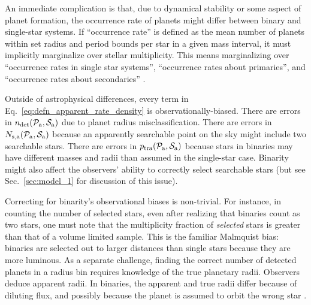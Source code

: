 \documentclass[12pt,modern]{aastex61}
\newcommand{\pp}{\mathcal{P}}
\newcommand{\ps}{\mathcal{S}}
\renewcommand{\a}{_{\rm a}}
\begin{document}
An immediate complication is that, due to dynamical stability or some 
aspect of planet formation, the occurrence rate of planets might differ 
between binary and single-star systems.
If ``occurrence rate'' is defined as the mean number of planets within 
set radius and period bounds per star in a given mass interval, it must 
implicitly marginalize over stellar multiplicity.
This means marginalizing over ``occurrence rates in single star systems'', 
``occurrence rates about primaries'', and
``occurrence rates about secondaries''
\citep[see][]{wang_occurrence_2015}.

Outside of astrophysical differences, every term in 
Eq.~\ref{eq:defn_apparent_rate_density} is observationally-biased.
There are errors in $n_{\rm det}(\pp\a,\ps\a)$ due to planet radius 
misclassification.
There are errors in $N_{{\rm s,a}}(\pp\a,\ps\a)$ because an apparently 
searchable point on the sky might include two searchable stars.
There are errors in $p_{\rm tra}(\pp\a,\ps\a)$ because stars in binaries may 
have different masses and radii than assumed in the single-star case.
Binarity might also affect the observers' ability to correctly select 
searchable stars (but see Sec.~\ref{sec:model_1} for discussion of this 
issue).

Correcting for binarity's observational biases is non-trivial.
For instance, in counting the number of selected stars, even after realizing 
that binaries count as two stars, one must note that the multiplicity fraction 
of {\it selected} stars is greater than that of a volume limited 
sample.
This is the familiar Malmquist bias: binaries are selected out to larger 
distances than single stars because they are more luminous.
As a separate challenge, finding the correct number of detected planets in a 
radius bin requires knowledge of the true planetary radii.
Observers deduce apparent radii.
In binaries, the apparent and true radii differ because of diluting flux, 
and possibly because the planet is assumed to orbit the wrong star
\citep[\textit{e.g.},][]{furlan_kepler_2017}.
\end{document}
